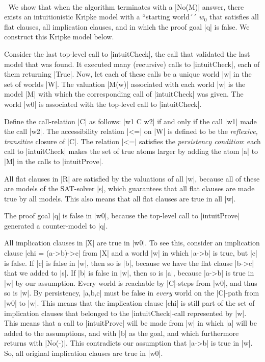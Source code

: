 \documentclass{llncs}
\begin{document}
~\\ $\;$ We show that when the algorithm terminates with a |No(M)| answer, there exists an intuitionistic Kripke model with a ``starting world´´ $w_0$ that satisfies all flat clauses, all implication clauses, and in which the proof goal |q| is false. We construct this Kripke model below.

Consider the last top-level call to |intuitCheck|, the call that validated the last model that was found. It executed many (recursive) calls to |intuitCheck|, each of them returning |True|. Now, let each of these calls be a unique world |w| in the set of worlds |W|. The valuation |M(w)| associated with each world |w| is the model |M| with which the corresponding call of |intuitCheck| was given. The world |w0| is associated with the top-level call to |intuitCheck|.

Define the call-relation |C| as follows: |w1 C w2| if and only if the call |w1| made the call |w2|. The accessibility relation |<=| on |W| is defined to be the {\em reflexive, transitive} closure of |C|. The relation |<=| satisfies the {\em persistency condition}: each call to |intuitCheck| makes the set of true atoms larger by adding the atom |a| to |M| in the calls to |intuitProve|.

All flat clauses in |R| are satisfied by the valuations of all |w|, because all of these are models of the SAT-solver |s|, which guarantees that all flat clauses are made true by all models. This also means that all flat clauses are true in all |w|.

The proof goal |q| is false in |w0|, because the top-level call to |intuitProve| generated a counter-model to |q|.

All implication clauses in |X| are true in |w0|. To see this, consider an implication clause |chi = (a->b)->c| from |X| and a world |w| in which |a->b| is true, but |c| is false. If |c| is false in |w|, then so is |b|, because we have the flat clause |b->c| that we added to |s|. If |b| is false in |w|, then so is |a|, because |a->b| is true in |w| by our assumption. Every world is reachable by |C|-steps from |w0|, and thus so is |w|. By persistency, |a,b,c| must be false in {\em every} world on the |C|-path from |w0| to |w|. This means that the implication clause |chi| is still part of the set of implication clauses that belonged to the |intuitCheck|-call represented by |w|. This means that a call to |intuitProve| will be made from |w| in which |a| will be added to the assumptions, and with |b| as the goal, and which furthermore returns with |No(-)|. This contradicts our assumption that |a->b| is true in |w|. So, all original implication clauses are true in |w0|.
\end{document}
